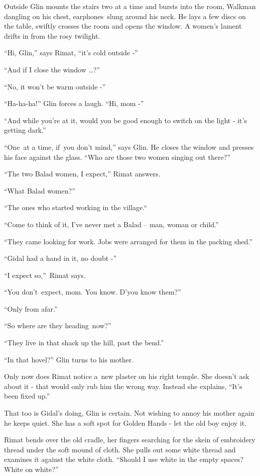 \documentclass[twoside,11pt]{book}
\begin{document}
Outside Glin mounts the stairs
two at a time and bursts into the room, Walkman dangling on his
chest, earphones~slung around his neck. He lays a few discs on the
table, swiftly crosses the room and opens the window.
A women's lament drifts in from the rosy twilight.

``Hi, Glin,''
says Rimat,  ``it's cold outside -''

``And if I close the window \dots?''

``No, it won't be warm outside -''

``Ha-ha-ha!'' Glin forces a
laugh. ``Hi, mom -'' 

``And while you're at it, would you be good enough to switch on the
light - it's getting dark.''

``One~at a time, if~you don't
mind,'' says Glin. He closes the window and presses his face against
the glass. ``Who are those
two women singing out
there?''

``The two Balad women, I
expect,'' Rimat answers.

``What Balad women?''

``The ones who started working in the
village.``

``Come to think of it, I've never met a Balad -- man,
woman or child.''

``They came looking for work. Jobs were arranged for them in the
packing shed.''

``Gidal had a hand in it, no doubt -''

``I expect
so,''~Rimat says. 

``You
don't~expect, mom. You know.
D'you know them?''

``Only from afar.''

``So where are they heading~now?''

``They live in that shack up the hill,
past the bend.''

``In that hovel?'' Glin turns to his
mother.

Only now does Rimat notice a~new plaster
on his right temple. She doesn't ask about
it - that would only rub him the wrong
way. Instead she explains, ``It's been fixed up.''

That too is Gidal's doing, Glin is certain. Not wishing to annoy his
mother again he keeps quiet. She has a soft spot for Golden Hands -
 let the old boy enjoy it.

Rimat bends over the old cradle, her fingers searching for the
skein of embroidery thread under the soft mound of cloth. She pulls
out some white thread and examines it against the white cloth.
``Should I use white in the empty spaces? White on white?''
\end{document}
